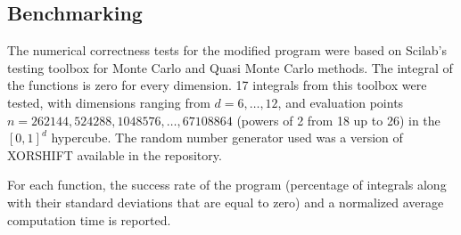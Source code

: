 \documentclass[english]{maciarticle}
\begin{document}
\subsection*{Benchmarking}

The numerical correctness tests for the modified program were based on Scilab's testing toolbox for Monte Carlo and Quasi Monte Carlo methods\cite{baudin}. The integral of the functions is zero for every dimension. 17 integrals from this toolbox were tested, with dimensions ranging from $d=6,\dots, 12$, and evaluation points $n = 262144, 524288, 1048576, \dots, 67108864$ (powers of 2 from 18 up to 26) in the $[0, 1]^d$ hypercube. The random number generator used was a version of XORSHIFT available in the repository.

For each function, the success rate of the program (percentage of integrals along with their standard deviations that are equal to zero) and a normalized average computation time is reported.

\end{document}
